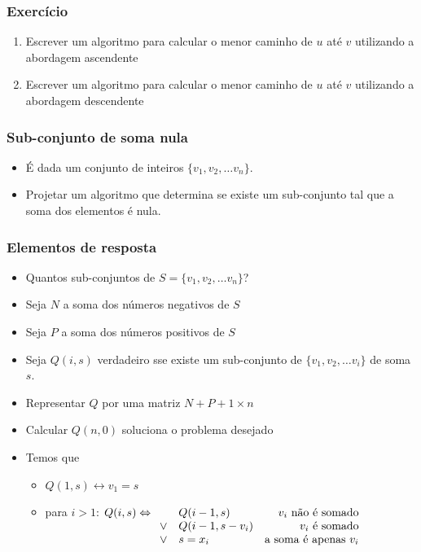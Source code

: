 \documentclass{beamer}
\begin{document}
\begin{frame}

\frametitle{Exercício}

\begin{enumerate}
\item Escrever um algoritmo para calcular o menor caminho de $u$ até $v$
  utilizando a abordagem ascendente
\item Escrever um algoritmo para calcular o menor caminho de $u$ até $v$
  utilizando a abordagem descendente
\end{enumerate}

\end{frame}

\begin{frame}
\frametitle{Sub-conjunto de soma nula}

\begin{itemize}
\item É dada um conjunto de inteiros $\{v_1, v_2, \ldots v_n\}$.

\item Projetar um algoritmo que determina se existe um sub-conjunto tal que a
  soma dos elementos é nula.
\end{itemize}

\end{frame}

\begin{frame}
\frametitle{Elementos de resposta}

\begin{itemize}
\item Quantos sub-conjuntos de $S = \{v_1, v_2, \ldots v_n\}$?
\item Seja $N$ a soma dos números negativos de $S$
\item Seja $P$ a soma dos números positivos de $S$
\item Seja $Q(i, s)$ verdadeiro sse existe um sub-conjunto de 
$\{v_1, v_2, \ldots v_i\}$ de soma $s$.
\item Representar $Q$ por uma matriz $N+P+1 \times n$
\item Calcular $Q(n, 0)$ soluciona o problema desejado
\item Temos que 
\begin{itemize}
\item $Q(1, s) \leftrightarrow v_1 = s$
\item para $i > 1$: $Q(i, s) \Leftrightarrow 
  \begin{array}[t]{rlr}
         & Q(i-1, s) & \text{$v_i$ não é somado} \\
    \lor & Q(i-1, s-v_i) & \text{$v_i$ é somado} \\
    \lor & s = x_i & \text{a soma é apenas $v_i$}
  \end{array}$
\end{itemize}
\end{itemize}

\end{frame}
\end{document}
